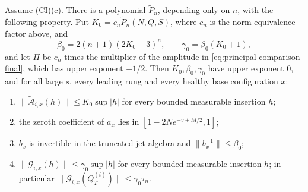 \begin{lemma}
\label{lem:allarity-reference-bounds}
Assume (CI)(c). There is a polynomial $\widetilde P_n$, depending only on
$n$, with the following property. Put
$K_0=c_n\widetilde P_n(N,Q,S)$, where $c_n$ is the norm-equivalence factor
above, and
\[
 \beta_0=2(n+1)(2K_0+3)^n,\qquad \gamma_0=\beta_0(K_0+1),
\]
and let $\Pi$ be $c_n$ times the multiplier of the amplitude in
\eqref{eq:principal-comparison-final}, which has upper exponent $-1/2$.
Then $K_0,\beta_0,\gamma_0$ have upper exponent $0$, and for all large
$s$, every leading rung and every healthy base configuration $x$:
\begin{enumerate}
\item $\|\widetilde{\mathcal A}_{i,x}(h)\|\le K_0\sup|h|$ for every bounded
 measurable insertion $h$;
\item the zeroth coefficient of $a_x$ lies in $[1-2Ne^{-v+M/2},1]$;
\item $b_x$ is invertible in the truncated jet algebra and
 $\|b_x^{-1}\|\le\beta_0$;
\item $\|\mathcal G_{i,x}(h)\|\le\gamma_0\sup|h|$ for every bounded
 measurable insertion $h$; in particular
 $\|\mathcal G_{i,x}(Q^{(i)}_T)\|\le\gamma_0\tau_n$.
\end{enumerate}
\end{lemma}
